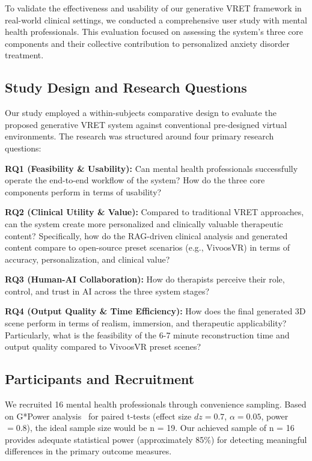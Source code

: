 \documentclass[]{interact}
\begin{document}
To validate the effectiveness and usability of our generative VRET framework in real-world clinical settings, we conducted a comprehensive user study with mental health professionals. This evaluation focused on assessing the system's three core components and their collective contribution to personalized anxiety disorder treatment.

\subsection{Study Design and Research Questions}

Our study employed a within-subjects comparative design to evaluate the proposed generative VRET system against conventional pre-designed virtual environments. The research was structured around four primary research questions:

\textbf{RQ1 (Feasibility \& Usability):} Can mental health professionals successfully operate the end-to-end workflow of the system? How do the three core components perform in terms of usability?

\textbf{RQ2 (Clinical Utility \& Value):} Compared to traditional VRET approaches, can the system create more personalized and clinically valuable therapeutic content? Specifically, how do the RAG-driven clinical analysis and generated content compare to open-source preset scenarios (e.g., VivoosVR) in terms of accuracy, personalization, and clinical value?

\textbf{RQ3 (Human-AI Collaboration):} How do therapists perceive their role, control, and trust in AI across the three system stages?

\textbf{RQ4 (Output Quality \& Time Efficiency):} How does the final generated 3D scene perform in terms of realism, immersion, and therapeutic applicability? Particularly, what is the feasibility of the 6-7 minute reconstruction time and output quality compared to VivoosVR preset scenes?

\subsection{Participants and Recruitment}

We recruited 16 mental health professionals through convenience sampling. Based on G*Power analysis~\cite{faul2007gpower} for paired t-tests (effect size $dz = 0.7$, $\alpha = 0.05$, power $= 0.8$), the ideal sample size would be n = 19. Our achieved sample of n = 16 provides adequate statistical power (approximately 85\%) for detecting meaningful differences in the primary outcome measures.
\end{document}
